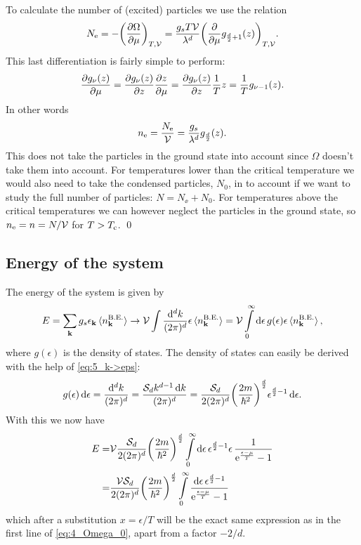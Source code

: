 \documentclass[11pt,letter, swedish, english
]{article}
\begin{document}
To calculate the number of (excited) particles we use the relation
\begin{equation}
N_{\mathrm{e}}=-\qty(\pdv{\Omega}{\mu})_{T,\mathcal{V}}
=\frac{g_sT\mathcal{V}}{\lambda^d}
\qty(\pdv{\mu}g_{\frac{d}{2}+1}(z))_{T,\mathcal{V}}.
\end{equation}
This last differentiation is fairly simple to perform:
\begin{equation}
\pdv{g_{\nu}(z)}{\mu}=
\pdv{g_{\nu}(z)}{z}\pdv{z}{\mu}=
\pdv{g_{\nu}(z)}{z}\frac{1}{T}z
=\frac{1}{T}g_{\nu-1}(z).
\end{equation}
In other words
\begin{equation}\label{eq:4_ne}
n_{\mathrm{e}}=\frac{N_{\mathrm{e}}}{\mathcal{V}}
=\frac{g_s}{\lambda^d}g_{\frac{d}{2}}(z).
\end{equation}
This does not take the particles in the ground state into account
since $\Omega$ doesn't take them into account. For temperatures lower
than the critical temperature we would also need to take the condensed
particles, $N_0$, in to account if we want to study the full number of
particles: $N=N_\ee+N_0$. For temperatures above the critical
temperatures we can however neglect the particles in the ground
state, so $n_{\mathrm{e}}=n=N/\mathcal{V}$ for $T>T_{\text{c}}$.
\qed

\subsection{Energy of the system}
The energy of the system is given by
\begin{equation}
E=\sum_{\vb{k}} g_s \epsilon_{\vb{k}}\ev*{n_{\vb{k}}^\text{B.E.}}
\to \V\int\frac{\rd^dk}{(2\pi)^d}
\epsilon\ev*{n_{\vb{k}}^\text{B.E.}}
=\V\int_0^\infty\rd\epsilon\, g(\epsilon)
\epsilon\ev*{n_{\vb{k}}^\text{B.E.}},
\end{equation}
where $g(\epsilon)$ is the density of states\footnotemark{}. The density
of states can easily be derived with the help of \eqref{eq:5_k->eps}:
\begin{equation}
g(\epsilon)\,\mathrm{d}\epsilon=\frac{\mathrm{d}^dk}{(2\pi)^d}
=\frac{\mathcal{S}_d k^{d-1}\,\mathrm{d}{k}}{(2\pi)^d}
=\frac{\mathcal{S}_d}{2(2\pi)^d}\qty(\frac{2m}{\hbar^2})^{\frac{d}{2}}
\epsilon^{\frac{d}{2}-1}\,\mathrm{d}\epsilon.
\end{equation}
With this we now have
\begin{equation}
\begin{aligned}
E=&\V\frac{\Sd}{2(2\pi)^d}\qty(\frac{2m}{\hbar^2})^{\D{2}}
\int_0^\infty\rd\epsilon\, \epsilon^{\D{2}-1}
\epsilon\,\frac{1}{\ee^{\frac{\epsilon-\mu}{T}}-1}\\
=&\frac{\V\Sd}{2(2\pi)^d}\qty(\frac{2m}{\hbar^2})^{\D{2}}
\int_0^\infty
\frac{\rd\epsilon\,\epsilon^{\D{2}-1}}{\ee^{\frac{\epsilon-\mu}{T}}-1}
\end{aligned}
\end{equation}
which after a substitution $x=\epsilon/T$ will be the exact same
expression as in the first line of \eqref{eq:4_Omega_0}, apart from a
factor $-2/d$. 
\end{document}
